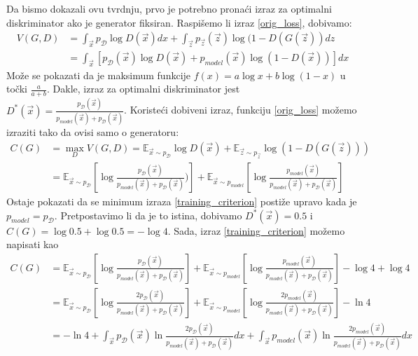 Da bismo dokazali ovu tvrdnju, prvo je potrebno pronaći izraz za optimalni diskriminator ako je generator fiksiran. Raspišemo li izraz \ref{orig_loss}, dobivamo:
\begin{align*}
V(G, D) &= \int_{\vec{x}} p_{\mathcal{D}}\log D(\vec{x})dx +\int_{\vec{z}} p_{\vec{z}}(\vec{z})\log(1 - D(G(\vec{z}))dz \\
	 &= \int_{\vec{x}} \left[p_{\mathcal{D}}(\vec{x})\log D(\vec{x}) + p_{model}(\vec{x})\log(1 - D(\vec{x}))\right] dx
\end{align*}
Može se pokazati da je maksimum funkcije $f(x) = a \log x + b \log (1 - x)$ u točki $\frac{a}{a + b}$. Dakle, izraz za optimalni diskriminator jest $D^*(\vec{x}) = \frac{p_{\mathcal{D}}(\vec{x})}{p_{model}(\vec{x}) + p_{\mathcal{D}}(\vec{x})}$. Koristeći dobiveni izraz, funkciju \ref{orig_loss} možemo izraziti tako da ovisi samo o generatoru:
\begin{align}
C(G) &= \max_D V(G, D) = \mathbb{E}_{\vec{x} \sim p_{\mathcal{D}}}\log D(\vec{x}) + \mathbb{E}_{\vec{z} \sim p_{\vec{z}}} \log (1 - D(G(\vec{z}))) \\ 
&= \mathbb{E}_{\vec{x} \sim p_{\mathcal{D}}}\left[\log \frac{p_{\mathcal{D}}(\vec{x})}{p_{model}(\vec{x}) + p_{\mathcal{D}}(\vec{x})})\right] + \mathbb{E}_{\vec{x} \sim p_{model}}\left[\log \frac{p_{model}(\vec{x})}{p_{model}(\vec{x}) + p_{\mathcal{D}}(\vec{x})}\right] \label{training_criterion}
\end{align}
Ostaje pokazati da se minimum izraza \ref{training_criterion} postiže upravo kada je $p_{model} = p_{\mathcal{D}}$. Pretpostavimo li da je to istina, dobivamo $D^*(\vec{x}) = 0.5$ i $C(G) = \log 0.5 + \log 0.5 = -\log 4$. Sada, izraz \ref{training_criterion} možemo napisati kao
\begin{align}
C(G) &= \mathbb{E}_{\vec{x} \sim p_{\mathcal{D}}}\left[\log \frac{p_{\mathcal{D}}(\vec{x})}{p_{model}(\vec{x}) + p_{\mathcal{D}}(\vec{x})}\right] + \mathbb{E}_{\vec{x} \sim p_{model}}\left[\log \frac{p_{model}(\vec{x})}{p_{model}(\vec{x}) + p_{\mathcal{D}}(\vec{x})}\right] - \log 4 + \log 4 \\
&= \mathbb{E}_{\vec{x} \sim p_{\mathcal{D}}}\left[\log \frac{2p_{\mathcal{D}}(\vec{x})}{p_{model}(\vec{x}) + p_{\mathcal{D}}(\vec{x})}\right] + \mathbb{E}_{\vec{x} \sim p_{model}}\left[\log \frac{2p_{model}(\vec{x})}{p_{model}(\vec{x}) + p_{\mathcal{D}}(\vec{x})}\right] - \ln 4 \\
&= -\ln4 + \int_{\vec{x}} p_{\mathcal{D}}(\vec{x}) \ln \frac{2p_{\mathcal{D}}(\vec{x})}{p_{model}(\vec{x}) + p_{\mathcal{D}}(\vec{x})}dx + \int_{\vec{x}} p_{model}(\vec{x}) \ln \frac{2p_{model}(\vec{x})}{p_{model}(\vec{x}) + p_{\mathcal{D}}(\vec{x})}dx \label{KL}
\end{align}
